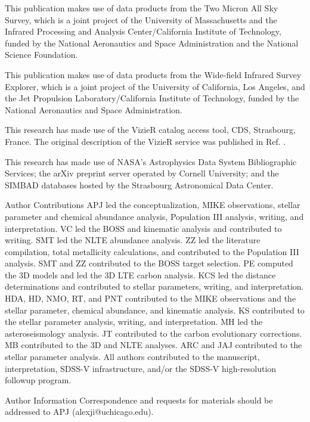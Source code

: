 \documentclass{natureprintstyle}
\begin{document}
\begin{addendum}
This publication makes use of data products from the Two Micron All
Sky Survey, which is a joint project of the University of Massachusetts
and the Infrared Processing and Analysis Center/California Institute of
Technology, funded by the National Aeronautics and Space Administration
and the National Science Foundation.

This publication makes use of data products from the Wide-field Infrared
Survey Explorer, which is a joint project of the University of California,
Los Angeles, and the Jet Propulsion Laboratory/California Institute of
Technology, funded by the National Aeronautics and Space Administration.

This research has made use of the VizieR catalog access tool, CDS,
Strasbourg, France.  The original description of the VizieR service was
published in Ref. \cite{och00}.

This research has made use of NASA’s Astrophysics Data System Bibliographic Services; the arXiv preprint server operated by Cornell University; and the SIMBAD databases hosted by the Strasbourg Astronomical Data Center.

\item[Author Contributions] 
APJ led the conceptualization, MIKE observations, stellar parameter and chemical abundance analysis, Population III analysis, writing, and interpretation. VC led the BOSS and kinematic analysis and contributed to writing. SMT led the NLTE abundance analysis. ZZ led the literature compilation, total metallicity calculations, and contributed to the Population III analysis. SMT and ZZ contributed to the BOSS target selection. PE computed the 3D models and led the 3D LTE carbon analysis. KCS led the distance determinations and contributed to stellar parameters, writing, and interpretation. HDA, HD, NMO, RT, and PNT contributed to the MIKE observations and the stellar parameter, chemical abundance, and kinematic analysis. KS contributed to the stellar parameter analysis, writing, and interpretation. MH led the asteroseismology analysis. JT contributed to the carbon evolutionary corrections. MB contributed to the 3D and NLTE analyses. ARC and JAJ contributed to the stellar parameter analysis. All authors contributed to the manuscript, interpretation, SDSS-V infrastructure, and/or the SDSS-V high-resolution followup program.

\item[Author Information] Correspondence and requests for materials should be addressed to APJ (alexji@uchicago.edu).


\end{addendum}
\end{document}
